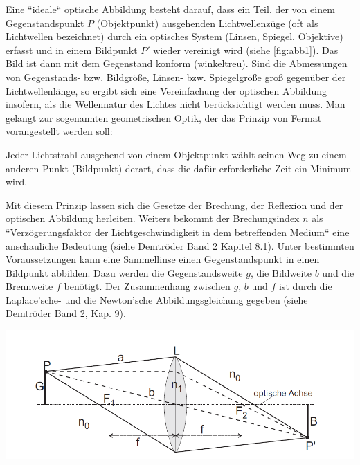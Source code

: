 \documentclass[11pt,ngerman]{scrartcl}
\begin{document}
Eine ``ideale`` optische Abbildung besteht darauf, dass ein Teil, der von einem Gegenstandspunkt
$P$ (Objektpunkt) ausgehenden Lichtwellenzüge (oft als Lichtwellen bezeichnet) durch ein optisches
System (Linsen, Spiegel, Objektive) erfasst und in einem Bildpunkt $P'$ wieder vereinigt
wird (siehe \autoref{fig:abb1}). Das Bild ist dann mit dem Gegenstand konform (winkeltreu). Sind die
Abmessungen von Gegenstands- bzw. Bildgröße, Linsen- bzw. Spiegelgröße groß gegenüber der
Lichtwellenlänge, so ergibt sich eine Vereinfachung der optischen Abbildung insofern, als die
Wellennatur des Lichtes nicht berücksichtigt werden muss. Man gelangt zur sogenannten geometrischen
Optik, der das Prinzip von Fermat vorangestellt werden soll:

\vspace{2mm}

Jeder Lichtstrahl ausgehend von einem Objektpunkt wählt seinen Weg zu einem
anderen Punkt (Bildpunkt) derart, dass die dafür erforderliche Zeit ein Minimum
wird.

\vspace{2mm}

Mit diesem Prinzip lassen sich die Gesetze der Brechung, der Reflexion und der optischen Abbildung
herleiten. Weiters bekommt der Brechungsindex $n$ als ``Verzögerungsfaktor der Lichtgeschwindigkeit
in dem betreffenden Medium`` eine anschauliche Bedeutung (siehe Demtröder
Band 2 Kapitel 8.1).
Unter bestimmten Voraussetzungen kann eine Sammellinse einen Gegenstandspunkt in einen
Bildpunkt abbilden. Dazu werden die Gegenstandsweite $g$, die Bildweite $b$ und die Brennweite
$f$ benötigt. Der Zusammenhang zwischen $g$, $b$ und $f$ ist durch die Laplace'sche- und die
Newton'sche Abbildungsgleichung gegeben (siehe Demtröder Band 2, Kap. 9).

\begin{center}
	\begin{minipage}[t]{\textwidth}
		\centering
		\includegraphics[width=\textwidth]{abb1}
		\label{fig:abb1}
	\end{minipage}
\end{center}
\end{document}
